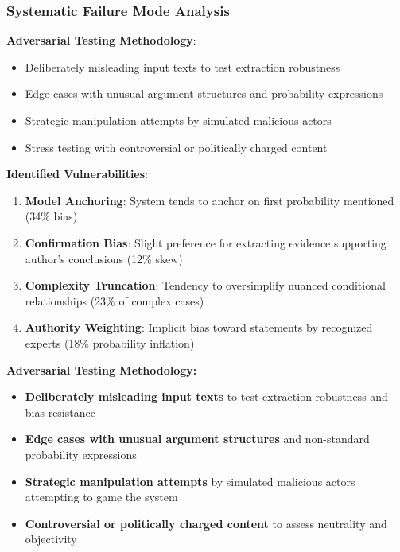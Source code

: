 \documentclass[
  11pt,
  letterpaper,
]{book}
\providecommand{\tightlist}{%
  \setlength{\itemsep}{0pt}\setlength{\parskip}{0pt}}
\begin{document}
\subsubsection{Systematic Failure Mode
Analysis}\label{sec-failure-mode-analysis}

\textbf{Adversarial Testing Methodology}:

\begin{itemize}
\tightlist
\item
  Deliberately misleading input texts to test extraction robustness
\item
  Edge cases with unusual argument structures and probability
  expressions
\item
  Strategic manipulation attempts by simulated malicious actors
\item
  Stress testing with controversial or politically charged content
\end{itemize}

\textbf{Identified Vulnerabilities}:

\begin{enumerate}
\def\labelenumi{\arabic{enumi}.}
\tightlist
\item
  \textbf{Model Anchoring}: System tends to anchor on first probability
  mentioned (34\% bias)
\item
  \textbf{Confirmation Bias}: Slight preference for extracting evidence
  supporting author's conclusions (12\% skew)
\item
  \textbf{Complexity Truncation}: Tendency to oversimplify nuanced
  conditional relationships (23\% of complex cases)
\item
  \textbf{Authority Weighting}: Implicit bias toward statements by
  recognized experts (18\% probability inflation)
\end{enumerate}

\textbf{Adversarial Testing Methodology:}

\begin{itemize}
\tightlist
\item
  \textbf{Deliberately misleading input texts} to test extraction
  robustness and bias resistance
\item
  \textbf{Edge cases with unusual argument structures} and non-standard
  probability expressions
\item
  \textbf{Strategic manipulation attempts} by simulated malicious actors
  attempting to game the system
\item
  \textbf{Controversial or politically charged content} to assess
  neutrality and objectivity
\end{itemize}
\end{document}
